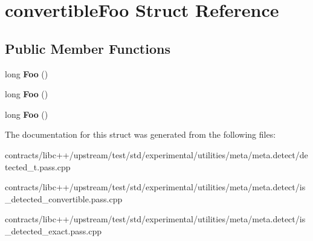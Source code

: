 \hypertarget{structconvertible_foo}{}\section{convertible\+Foo Struct Reference}
\label{structconvertible_foo}
\subsection*{Public Member Functions}
\begin{DoxyCompactItemize}
\item 
\mbox{\label{structconvertible_foo_a1a25765caf07c2994fb8f22cb22a1527}} 
long {\bfseries Foo} ()
\item 
\mbox{\label{structconvertible_foo_a1a25765caf07c2994fb8f22cb22a1527}} 
long {\bfseries Foo} ()
\item 
\mbox{\label{structconvertible_foo_a1a25765caf07c2994fb8f22cb22a1527}} 
long {\bfseries Foo} ()
\end{DoxyCompactItemize}


The documentation for this struct was generated from the following files\+:\begin{DoxyCompactItemize}
\item 
contracts/libc++/upstream/test/std/experimental/utilities/meta/meta.\+detect/detected\+\_\+t.\+pass.\+cpp\item 
contracts/libc++/upstream/test/std/experimental/utilities/meta/meta.\+detect/is\+\_\+detected\+\_\+convertible.\+pass.\+cpp\item 
contracts/libc++/upstream/test/std/experimental/utilities/meta/meta.\+detect/is\+\_\+detected\+\_\+exact.\+pass.\+cpp\end{DoxyCompactItemize}

